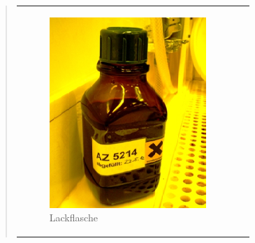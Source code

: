 \begin{quote}
\begin{center}
\begin{tabular}{ll}
\begin{minipage}{0.7\textwidth}
                    \end{minipage}
                    \begin{minipage}{0.3\textwidth}

                        \begin{figure}[H]
                        \hspace{-1em}
                            \includegraphics[scale=1.0, trim = 0cm 0cm 0cm
                            0cm, clip]
                            {./HerstellungBilder/Lackflasche.png}
                            \caption{Lackflasche}
                           \label{fig:lackfl}
                        \end{figure}
                    \vspace{-1.5em}

                    \end{minipage}

                \end{tabular}
			\end{center}

    		\vspace{2em}


\end{quote}
